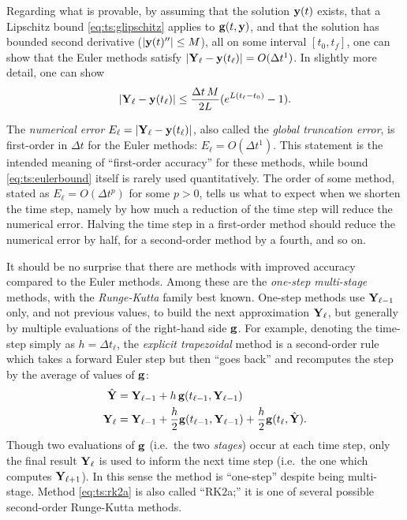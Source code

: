 Regarding what is provable, by assuming that the solution $\mathbf{y}(t)$ exists, that a Lipschitz bound \eqref{eq:ts:glipschitz} applies to $\mathbf{g}(t,\mathbf{y})$, and that the solution has bounded second derivative ($|\mathbf{y}(t)''|\le M$), all on some interval $[t_0,t_f]$, one can show that the Euler methods satisfy $|\mathbf{Y}_\ell-\mathbf{y}(t_\ell)| = O(\Delta t^1)$.  In slightly more detail, one can show \citep{AscherPetzold1998}
\begin{equation}
|\mathbf{Y}_\ell-\mathbf{y}(t_\ell)| \le \frac{\Delta t\,M}{2L} (e^{L(t_\ell-t_0)}-1).  \label{eq:ts:eulerbound}
\end{equation}

The \emph{numerical error} $E_\ell = |\mathbf{Y}_\ell-\mathbf{y}(t_\ell)|$, also called the \emph{global truncation error}, is first-order in $\Delta t$ for the Euler methods: $E_\ell = O(\Delta t^1)$.  This statement is the intended meaning of ``first-order accuracy'' for these methods, while bound \eqref{eq:ts:eulerbound} itself is rarely used quantitatively.  The order of some method, stated as $E_\ell = O(\Delta t^p)$ for some $p>0$, tells us what to expect when we shorten the time step, namely by how much a reduction of the time step will reduce the numerical error.  Halving the time step in a first-order method should reduce the numerical error by half, for a second-order method by a fourth, and so on.

\newcommand{\RKtwoa}{RK$2$a\xspace}
\newcommand{\RKthreebs}{RK$3$bs\xspace}
\newcommand{\RKfour}{RK$4$\xspace}

It should be no surprise that there are methods with improved accuracy compared to the Euler methods.  Among these are the \emph{one-step multi-stage} methods, with the \emph{Runge-Kutta} family best known.  One-step methods use $\mathbf{Y}_{\ell-1}$ only, and not previous values, to build the next approximation $\mathbf{Y}_\ell$, but generally by multiple evaluations of the right-hand side $\mathbf{g}$.  For example, denoting the time-step simply as $h=\Delta t_\ell$, the \emph{explicit trapezoidal} method \citep{AscherPetzold1998} is a second-order rule which takes a forward Euler step but then ``goes back'' and recomputes the step by the average of values of $\mathbf{g}$:
\begin{align}
\hat{\mathbf{Y}} &= \mathbf{Y}_{\ell-1} + h\, \mathbf{g}(t_{\ell-1},\mathbf{Y}_{\ell-1}) \label{eq:ts:rk2a} \\
\mathbf{Y}_\ell &= \mathbf{Y}_{\ell-1} + \frac{h}{2} \mathbf{g}(t_{\ell-1},\mathbf{Y}_{\ell-1}) + \frac{h}{2} \mathbf{g}(t_\ell,\hat{\mathbf{Y}}). \notag
\end{align}
Though two evaluations of $\mathbf{g}$ (i.e.~the two \emph{stages}) occur at each time step, only the final result $\mathbf{Y}_\ell$ is used to inform the next time step (i.e.~the one which computes $\mathbf{Y}_{\ell+1}$).  In this sense the method is ``one-step'' despite being multi-stage.  Method \eqref{eq:ts:rk2a} is also called ``\RKtwoa;'' it is one of several possible second-order Runge-Kutta methods.

